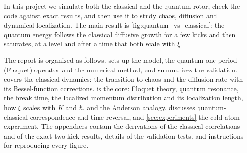 In this project we simulate both the classical and the quantum rotor, check the code against exact results,
and then use it to study chaos, diffusion and dynamical localization. The main result is
\cref{fig:quantum_vs_classical}: the quantum energy follows the classical diffusive growth for a few kicks
and then saturates, at a level and after a time that both scale with $\xi$.

The report is organized as follows.  sets up the model, the quantum one-period
(Floquet) operator and the numerical method, and summarizes the validation.  covers the
classical dynamics: the transition to chaos and the diffusion rate with its Bessel-function corrections.
 is the core: Floquet theory, quantum resonance, the break time, the localized momentum
distribution and its localization length, how $\xi$ scales with $K$ and $\hbar$, and the Anderson
analogy.  discusses quantum-classical correspondence and time reversal, and
\cref{sec:experiments} the cold-atom experiment. The appendices contain the derivations of the classical
correlations and of the exact two-kick results, details of the validation tests, and instructions for
reproducing every figure.
